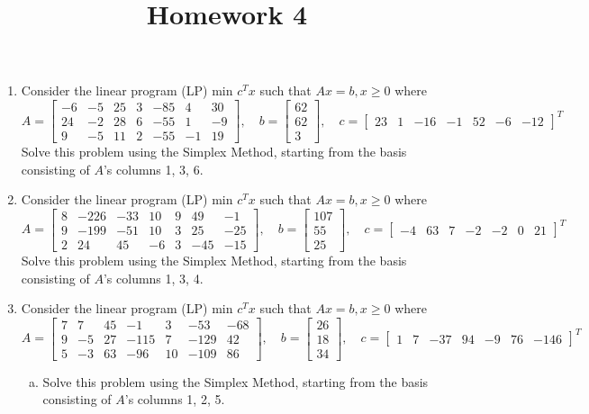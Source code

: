 \documentclass{article}
\begin{document}
\title{Homework 4}
\maketitle
\thispagestyle{fancy}

\begin{enumerate}[1:]
	\item Consider the linear program (LP) min $c^Tx$ such that $Ax=b, x\ge0$ where \[A=\begin{bmatrix}
				-6 & -5 & 25 & 3 & -85 & 4 & 30 \\
				24 & -2 & 28 & 6 & -55 & 1 & -9 \\
				9 & -5 & 11 & 2 & -55 & -1 & 19
			\end{bmatrix}, \quad b=\begin{bmatrix}
				62 \\ 62 \\ 3
			\end{bmatrix}, \quad c= \begin{bmatrix}
				23 & 1 & -16 & -1 & 52 & -6 & -12
		\end{bmatrix}^T\] Solve this problem using the Simplex Method, starting from the basis consisting of $A$'s columns 1, 3, 6.
		

	\item Consider the linear program (LP) min $c^Tx$ such that $Ax=b, x\ge 0$ where \[A=\begin{bmatrix}
				8 & -226 & -33 & 10 & 9 & 49 & -1 \\
				9 & -199 & -51 & 10 & 3 & 25 & -25 \\
				2 & 24 & 45 & -6 & 3 & -45 & -15
			\end{bmatrix}, \quad b=\begin{bmatrix}
				107 \\ 55 \\ 25
			\end{bmatrix}, \quad c=\begin{bmatrix}
				-4 & 63 & 7 & -2 & -2 & 0 & 21
		\end{bmatrix}^T\] Solve this problem using the Simplex Method, starting from the basis consisting of $A$'s columns 1, 3, 4.

	\item Consider the linear program (LP) min $c^T x$ such that $Ax=b, x\ge 0$ where \[A=\begin{bmatrix}
				7 & 7 & 45 & -1 & 3 & -53 & -68 \\
				9 & -5 & 27 &  -115 & 7 & -129 & 42 \\
				5 & -3 & 63 & -96 & 10 & -109 & 86
			\end{bmatrix}, \quad b=\begin{bmatrix}
				26 \\ 18 \\ 34
			\end{bmatrix}, \quad c=\begin{bmatrix}
				1 & 7 & -37 & 94 & -9 & 76 & -146
		\end{bmatrix}^T\]
		\begin{enumerate}[a)]
			\item Solve this problem using the Simplex Method, starting from the basis consisting of $A$'s columns 1, 2, 5.


\end{enumerate}
\end{enumerate}
\end{document}
